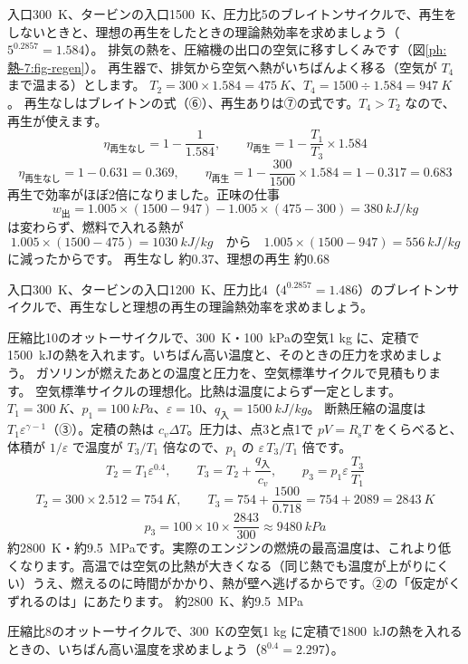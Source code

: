 \label{ph:熱-7:ex8}
\begin{phreidai}[再生をしたガスタービン]
入口\qty{300}{K}、タービンの入口\qty{1500}{K}、圧力比5のブレイトンサイクルで、再生をしないときと、理想の再生をしたときの理論熱効率を求めましょう（$5^{0.2857}=1.584$）。
\phbamen
排気の熱を、圧縮機の出口の空気に移すしくみです（図\ref{ph:熱-7:fig-regen}）。
\phmushi
再生器で、排気から空気へ熱がいちばんよく移る（空気が $T_4$ まで温まる）とします。
\phzu
$T_2=300\times1.584=\qty{475}{K}$、$T_4=1500\div1.584=\qty{947}{K}$。
\phriyu
再生なしはブレイトンの式（⑥）、再生ありは⑦の式です。$T_4>T_2$ なので、再生が使えます。
\phtateru
\[\eta_{\text{再生なし}}=1-\frac{1}{1.584},\qquad\eta_{\text{再生}}=1-\frac{T_1}{T_3}\times1.584\]
\phtoku
\[\eta_{\text{再生なし}}=1-0.631=0.369,\qquad\eta_{\text{再生}}=1-\frac{300}{1500}\times1.584=1-0.317=0.683\]
\phtashikame
再生で効率がほぼ2倍になりました。正味の仕事
\[w_{\text{出}}=1.005\times(1500-947)-1.005\times(475-300)=\qty{380}{kJ/kg}\]
は変わらず、燃料で入れる熱が
\[1.005\times(1500-475)=\qty{1030}{kJ/kg}\quad\text{から}\quad1.005\times(1500-947)=\qty{556}{kJ/kg}\]
に減ったからです。
\kotae 再生なし 約0.37、理想の再生 約0.68
\end{phreidai}
\begin{jibun}
入口\qty{300}{K}、タービンの入口\qty{1200}{K}、圧力比4（$4^{0.2857}=1.486$）のブレイトンサイクルで、再生なしと理想の再生の理論熱効率を求めましょう。
\end{jibun}

\label{ph:熱-7:ex9}
\begin{phreidai}[オットーサイクルの最高温度]
圧縮比10のオットーサイクルで、\qty{300}{K}・\qty{100}{kPa}の空気1 kg に、定積で\qty{1500}{kJ}の熱を入れます。いちばん高い温度と、そのときの圧力を求めましょう。
\phbamen
ガソリンが燃えたあとの温度と圧力を、空気標準サイクルで見積もります。
\phmushi
空気標準サイクルの理想化。比熱は温度によらず一定とします。
\phzu
$T_1=\qty{300}{K}$、$p_1=\qty{100}{kPa}$、$\varepsilon=10$、$q_{\text{入}}=\qty{1500}{kJ/kg}$。
\phriyu
断熱圧縮の温度は $T_1\varepsilon^{\gamma-1}$（③）。定積の熱は $c_v\Delta T$。圧力は、点3と点1で $pV=R_{\mathrm s}T$ をくらべると、体積が $1/\varepsilon$ で温度が $T_3/T_1$ 倍なので、$p_1$ の $\varepsilon\,T_3/T_1$ 倍です。
\phtateru
\[T_2=T_1\varepsilon^{0.4},\qquad T_3=T_2+\frac{q_{\text{入}}}{c_v},\qquad p_3=p_1\varepsilon\,\frac{T_3}{T_1}\]
\phtoku
\[T_2=300\times2.512=\qty{754}{K},\qquad T_3=754+\frac{1500}{0.718}=754+2089=\qty{2843}{K}\]
\[p_3=100\times10\times\frac{2843}{300}\approx\qty{9480}{kPa}\]
\phtashikame
約\qty{2800}{K}・約\qty{9.5}{MPa}です。実際のエンジンの燃焼の最高温度は、これより低くなります。高温では空気の比熱が大きくなる（同じ熱でも温度が上がりにくい）うえ、燃えるのに時間がかかり、熱が壁へ逃げるからです。②の「仮定がくずれるのは」にあたります。
\kotae 約\qty{2800}{K}、約\qty{9.5}{MPa}
\end{phreidai}
\begin{jibun}
圧縮比8のオットーサイクルで、\qty{300}{K}の空気1 kg に定積で\qty{1800}{kJ}の熱を入れるときの、いちばん高い温度を求めましょう（$8^{0.4}=2.297$）。
\end{jibun}

